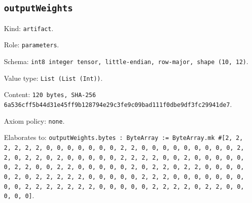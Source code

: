 \documentclass[11pt]{article}
\begin{document}
\subsection*{\texttt{outputWeights}}
\noindent Kind: \texttt{artifact}.\par
\noindent Role: \texttt{parameters}.\par
\noindent Schema: \texttt{int8 integer tensor, little-endian, row-major, shape (10, 12)}.\par
\noindent Value type: \texttt{List (List (Int))}.\par
\noindent Content: \texttt{120 bytes, SHA-256 6a536cff5b44d31e45ff9b128794e29c3fe9c09bad111f0dbe9df3fc29941de7}.\par
\noindent Axiom policy: \texttt{none}.\par
\noindent Elaborates to: \texttt{outputWeights.bytes : ByteArray := ByteArray.mk \#[2, 2, 2, 2, 2, 2, 0, 0, 0, 0, 0, 0, 0, 2, 2, 0, 0, 0, 0, 0, 0, 0, 0, 0, 2, 2, 0, 2, 2, 0, 2, 0, 0, 0, 0, 0, 2, 2, 2, 2, 0, 0, 2, 0, 0, 0, 0, 0, 0, 2, 2, 0, 0, 2, 2, 0, 0, 0, 0, 0, 2, 0, 2, 2, 0, 2, 2, 0, 0, 0, 0, 0, 2, 0, 2, 2, 2, 2, 2, 0, 0, 0, 0, 0, 2, 2, 2, 0, 0, 0, 0, 0, 0, 0, 0, 0, 2, 2, 2, 2, 2, 2, 2, 0, 0, 0, 0, 0, 2, 2, 2, 2, 0, 2, 2, 0, 0, 0, 0, 0]}.\par
\end{document}
